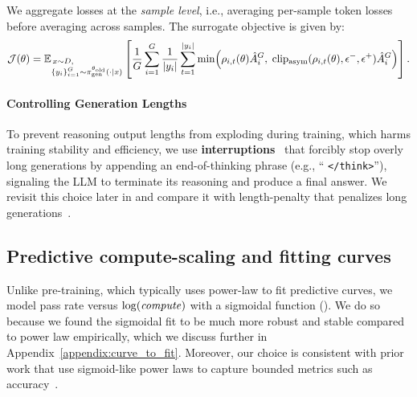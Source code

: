 \documentclass[]{fairmeta} %
\begin{document}
We aggregate losses at the \emph{sample level}, i.e., averaging per-sample token losses before averaging across samples. 
The surrogate objective is given by:
\begin{equation}\label{eq:grpo_loss}
    \mathcal{J}(\theta) 
    = \mathbb{E}_{\begin{subarray}{l} \, x \sim D, \\ \{y_i\}_{i=1}^G \sim {\pi_{\text{gen}}^{\theta_{\text{old}}}(\cdot \mid x)} \end{subarray}}
    \left[ \frac{1}{G} \sum_{i=1}^G \frac{1}{|y_i|} \sum_{t=1}^{|y_i|}
    \min\!\left( \rho_{i,t}(\theta)\hat{A}_i^{G},\; \mathrm{clip_{asym}}(\rho_{i,t}(\theta), \epsilon^-, \epsilon^+)\hat{A}_i^{G} \right) \right].
\end{equation}


\paragraph{Controlling Generation Lengths}  
To prevent reasoning output lengths from exploding during training, which harms training stability and efficiency, we use \textbf{interruptions}~\citep{glm_4.1v,qwen3technicalreport} that forcibly stop overly long generations by appending an end-of-thinking phrase (e.g., `` \texttt{</think>}''), signaling the LLM to terminate its reasoning and produce a final answer. We revisit this choice later in  and compare it with length-penalty that penalizes long generations~\citep{yu2025dapo,team2025kimi}.




\subsection{Predictive compute-scaling and fitting curves}


Unlike pre-training, which typically uses power-law to fit predictive curves, we model pass rate versus $\log(\text{\emph{compute}})$ with a sigmoidal function (). We do so because we found the sigmoidal fit to be much more robust and stable compared to power law empirically, which we discuss further in Appendix~\ref{appendix:curve_to_fit}. Moreover, our choice is consistent with prior work that use sigmoid-like power laws to capture bounded metrics such as accuracy~\citep{ruan2024,srivastava2022bigbench}.  
\end{document}
